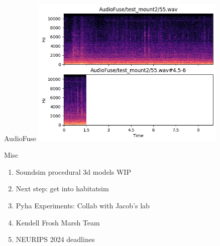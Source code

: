 \begin{frame}{AudioFuse}
    \centering
    \includegraphics[height=0.7\textheight,width=0.7\textwidth,keepaspectratio]{images/audio_fuse_demo.png}
\end{frame}

\begin{frame}{Misc}
    \begin{enumerate}
        \item Soundsim procedural 3d models WIP
        \item Next step: get into habitatsim
        \item Pyha Experiments: Collab with Jacob's lab
        \item Kendell Frosh Marsh Team
        \item NEURIPS 2024 deadlines
    \end{enumerate}
\end{frame}

